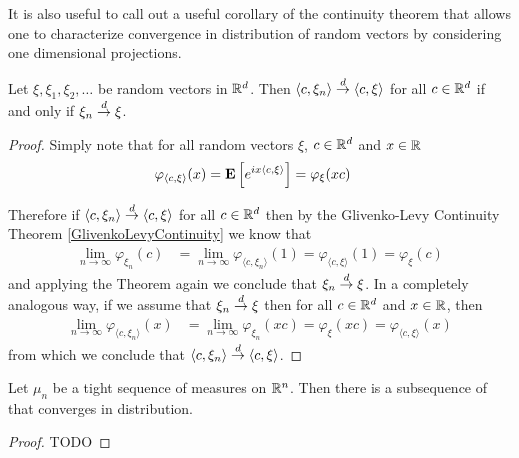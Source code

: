 It is also useful to call out a useful corollary of the continuity
theorem that allows one to characterize convergence in distribution of
random vectors by considering one dimensional projections.
\begin{cor}\label{CramerWoldDevice}Let $\xi, \xi_1, \xi_2, \dotsc$ be 
  random vectors in $\mathbb{R}^d$.  Then $\langle c, \xi_n \rangle
  \overset{d}\to \langle c, \xi \rangle$ for all $c \in \mathbb{R}^d$ if and only
  if $\xi_n \overset{d}\to \xi$.
\end{cor}
\begin{proof}
Simply note that for all random vectors $\xi$,
$c \in \mathbb{R}^d$ and $x \in \mathbb{R}$
\begin{align*}
\varphi_{\langle c , \xi\rangle}(x) &= \textbf{E}\left[e^{i x \langle
    c , \xi \rangle} \right]= \varphi_\xi(x c)
\end{align*}
 
Therefore if $\langle c, \xi_n \rangle
  \overset{d}\to \langle c, \xi \rangle$ for all $c \in \mathbb{R}^d$ then by the
  Glivenko-Levy Continuity Theorem \ref{GlivenkoLevyContinuity}
we know that 
\begin{align*}
\lim_{n \to \infty} \varphi_{\xi_n}(c) &= \lim_{n \to \infty}
\varphi_{\langle c, \xi_n \rangle}(1) = \varphi_{\langle c, \xi
  \rangle}(1) = \varphi_\xi(c)
\end{align*}
and applying the Theorem again we conclude that $\xi_n \overset{d}\to \xi$.  In
a completely analogous way, if we assume that $\xi_n \overset{d}\to \xi$ then
for all $c \in \mathbb{R}^d$ and $x\in \mathbb{R}$, then
\begin{align*}
\lim_{n \to \infty} \varphi_{\langle c, \xi_n \rangle}(x) &= \lim_{n \to \infty}
\varphi_{\xi_n}(x c) = \varphi_{\xi}(x c) = \varphi_{\langle c, \xi \rangle}(x)
\end{align*}
from which we conclude that $\langle c, \xi_n \rangle \overset{d}\to \langle
c, \xi \rangle$.
\end{proof}

\begin{thm}Let $\mu_n$ be a tight sequence of
  measures on $\mathbb{R}^n$.  Then there is a subsequence of that
  converges in distribution.
\end{thm}
\begin{proof}
TODO
\end{proof}
 
